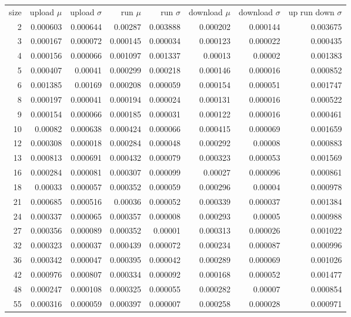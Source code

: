 \begin{tabular}{r r r r r r r r}
size & upload $\mu$  & upload $\sigma$ & run $\mu$ & run $\sigma$ & download $\mu$ & download $\sigma$ & up run down $\sigma$ \\
2 & 0.000603 & 0.000644 & 0.00287 & 0.003888 & 0.000202 & 0.000144 & 0.003675 \\
3 & 0.000167 & 0.000072 & 0.000145 & 0.000034 & 0.000123 & 0.000022 & 0.000435 \\
4 & 0.000156 & 0.000066 & 0.001097 & 0.001337 & 0.00013 & 0.00002 & 0.001383 \\
5 & 0.000407 & 0.00041 & 0.000299 & 0.000218 & 0.000146 & 0.000016 & 0.000852 \\
6 & 0.001385 & 0.00169 & 0.000208 & 0.000059 & 0.000154 & 0.000051 & 0.001747 \\
8 & 0.000197 & 0.000041 & 0.000194 & 0.000024 & 0.000131 & 0.000016 & 0.000522 \\
9 & 0.000154 & 0.000066 & 0.000185 & 0.000031 & 0.000122 & 0.000016 & 0.000461 \\
10 & 0.00082 & 0.000638 & 0.000424 & 0.000066 & 0.000415 & 0.000069 & 0.001659 \\
12 & 0.000308 & 0.000018 & 0.000284 & 0.000048 & 0.000292 & 0.00008 & 0.000883 \\
13 & 0.000813 & 0.000691 & 0.000432 & 0.000079 & 0.000323 & 0.000053 & 0.001569 \\
16 & 0.000284 & 0.000081 & 0.000307 & 0.000099 & 0.00027 & 0.000096 & 0.000861 \\
18 & 0.00033 & 0.000057 & 0.000352 & 0.000059 & 0.000296 & 0.00004 & 0.000978 \\
21 & 0.000685 & 0.000516 & 0.00036 & 0.000052 & 0.000339 & 0.000037 & 0.001384 \\
24 & 0.000337 & 0.000065 & 0.000357 & 0.000008 & 0.000293 & 0.00005 & 0.000988 \\
27 & 0.000356 & 0.000089 & 0.000352 & 0.00001 & 0.000313 & 0.000026 & 0.001022 \\
32 & 0.000323 & 0.000037 & 0.000439 & 0.000072 & 0.000234 & 0.000087 & 0.000996 \\
36 & 0.000342 & 0.000047 & 0.000395 & 0.000042 & 0.000289 & 0.000069 & 0.001026 \\
42 & 0.000976 & 0.000807 & 0.000334 & 0.000092 & 0.000168 & 0.000052 & 0.001477 \\
48 & 0.000247 & 0.000108 & 0.000325 & 0.000055 & 0.000282 & 0.00007 & 0.000854 \\
55 & 0.000316 & 0.000059 & 0.000397 & 0.000007 & 0.000258 & 0.000028 & 0.000971 \\

\end{tabular}
